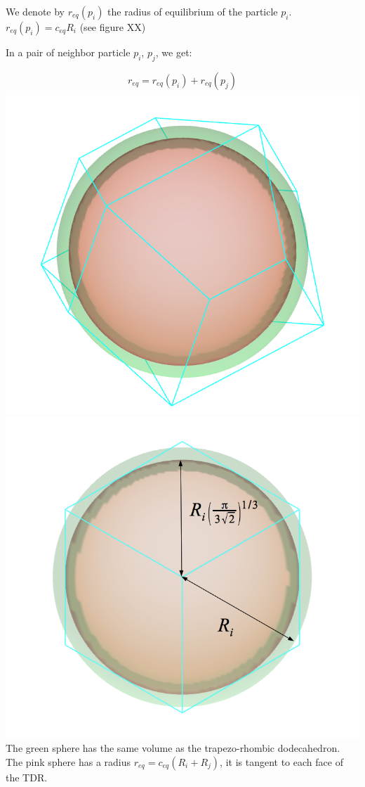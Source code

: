 We denote by $r_{eq}(p_i)$ the radius of equilibrium of the particle $p_i$. $r_{eq}(p_i) = c_{eq}R_i$ (see figure XX)

In a pair of neighbor particle $p_i$, $p_j$, we get:

$$ r_{eq} = r_{eq}(p_i) + r_{eq}(p_j) $$
\includegraphics{../../images/MECAGEN/potential/apf_sphere_raw2_crop.png}
\includegraphics{../../images/MECAGEN/potential/apf_sphere.png}The green sphere has the same volume as the trapezo-rhombic dodecahedron. The pink sphere has a radius $r_{eq} = c_{eq} (R_i+R_j)$, it is tangent to each face of the TDR.

